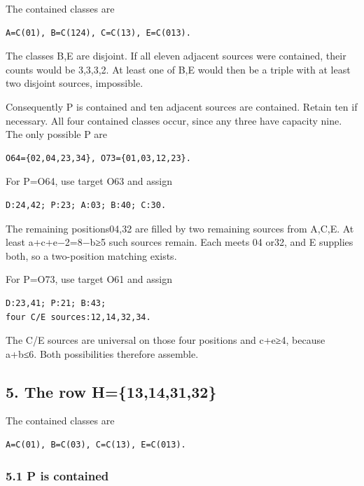 \documentclass[
  10pt,
]{article}
\begin{document}
The contained classes are

\begin{verbatim}
A=C(01), B=C(124), C=C(13), E=C(013).
\end{verbatim}

The classes B,E are disjoint. If all eleven adjacent sources were
contained, their counts would be 3,3,3,2. At least one of B,E would then
be a triple with at least two disjoint sources, impossible.

Consequently P is contained and ten adjacent sources are contained.
Retain ten if necessary. All four contained classes occur, since any
three have capacity nine. The only possible P are

\begin{verbatim}
O64={02,04,23,34}, O73={01,03,12,23}.
\end{verbatim}

For P=O64, use target O63 and assign

\begin{verbatim}
D:24,42; P:23; A:03; B:40; C:30.
\end{verbatim}

The remaining positions04,32 are filled by two remaining sources from
A,C,E. At least a+c+e−2=8−b≥5 such sources remain. Each meets 04 or32,
and E supplies both, so a two-position matching exists.

For P=O73, use target O61 and assign

\begin{verbatim}
D:23,41; P:21; B:43;
four C/E sources:12,14,32,34.
\end{verbatim}

The C/E sources are universal on those four positions and c+e≥4, because
a+b≤6. Both possibilities therefore assemble.

\hypertarget{the-row-h13143132}{%
\subsection*{5. The row H=\{13,14,31,32\}}\label{the-row-h13143132}}

The contained classes are

\begin{verbatim}
A=C(01), B=C(03), C=C(13), E=C(013).
\end{verbatim}

\hypertarget{p-is-contained}{%
\subsubsection*{5.1 P is contained}\label{p-is-contained}}
\end{document}
